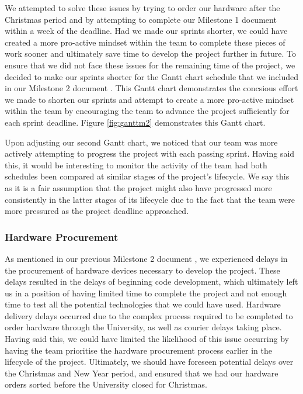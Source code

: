                 We attempted to solve these issues by trying to order our hardware after the Christmas period and by attempting to complete our Milestone 1 document within a week of the deadline. Had we made our sprints shorter, we could have created a more pro-active mindset within the team to complete these pieces of work sooner and ultimately save time to develop the project further in future. To ensure that we did not face these issues for the remaining time of the project, we decided to make our sprints shorter for the Gantt chart schedule that we included in our Milestone 2 document \cite{mile2}. This Gantt chart demonstrates the concsious effort we made to shorten our sprints and attempt to create a more pro-active mindset within the team by encouraging the team to advance the project sufficiently for each sprint deadline. Figure \ref{fig:ganttm2} demonstrates this Gantt chart.

                

                Upon adjusting our second Gantt chart, we noticed that our team was more actively attempting to progress the project with each passing sprint. Having said this, it would be interesting to monitor the activity of the team had both schedules been compared at similar stages of the project's lifecycle. We say this as it is a fair assumption that the project might also have progressed more consistently in the latter stages of its lifecycle due to the fact that the team were more pressured as the project deadline approached.

            \subsubsection{Hardware Procurement}

                As mentioned in our previous Milestone 2 document \cite{mile2}, we experienced delays in the procurement of hardware devices necessary to develop the project. These delays resulted in the delays of beginning code development, which ultimately left us in a position of having limited time to complete the project and not enough time to test all the potential technologies that we could have used. Hardware delivery delays occurred due to the complex process required to be completed to order hardware through the University, as well as courier delays taking place. Having said this, we could have limited the likelihood of this issue occurring by having the team prioritise the hardware procurement process earlier in the lifecycle of the project. Ultimately, we should have foreseen potential delays over the Christmas and New Year period, and ensured that we had our hardware orders sorted before the University closed for Christmas. 


